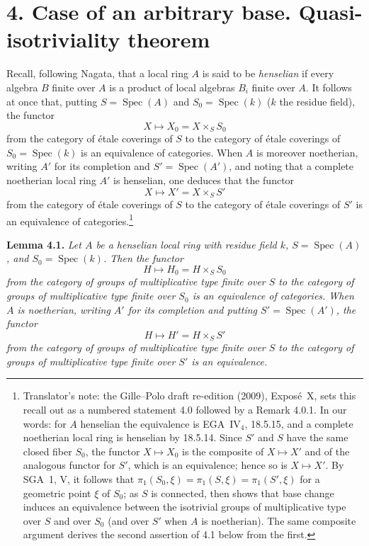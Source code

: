 \section*{4. Case of an arbitrary base. Quasi-isotriviality theorem}
{}

Recall, following Nagata, that a local ring \(A\) is said to be
\emph{henselian} if every algebra \(B\) finite over \(A\) is a product of local
algebras \(B_i\) finite over \(A\). It follows at once that, putting
\(S=\operatorname{Spec}(A)\) and \(S_0=\operatorname{Spec}(k)\) (\(k\) the
residue field), the functor
\[
  X\longmapsto X_0=X\times_S S_0
\]
from the category of étale coverings of \(S\) to the category of étale
coverings of \(S_0=\operatorname{Spec}(k)\) is an equivalence of categories.
When \(A\) is moreover noetherian, writing \(A'\) for its completion and
\(S'=\operatorname{Spec}(A')\), and noting that a complete noetherian local
ring \(A'\) is henselian, one deduces that the functor
\[
  X\longmapsto X'=X\times_S S'
\]
from the category of étale coverings of \(S\) to the category of étale
coverings of \(S'\) is an equivalence of categories.\footnote{Translator's
note: the Gille--Polo draft re-edition (2009), Expos\'e~X, sets this recall out
as a numbered statement 4.0 followed by a Remark 4.0.1. In our words: for
\(A\) henselian the equivalence is EGA~IV\(_4\), 18.5.15, and a complete
noetherian local ring is henselian by 18.5.14. Since \(S'\) and \(S\) have the
same closed fiber \(S_0\), the functor \(X\mapsto X_0\) is the composite of
\(X\mapsto X'\) and of the analogous functor for \(S'\), which is an
equivalence; hence so is \(X\mapsto X'\). By SGA~1, V, it follows that
\(\pi_1(S_0,\xi)=\pi_1(S,\xi)=\pi_1(S',\xi)\) for a geometric point \(\xi\) of
\(S_0\); as \(S\) is connected,  then shows that base change induces an
equivalence between the isotrivial groups of multiplicative type over \(S\)
and over \(S_0\) (and over \(S'\) when \(A\) is noetherian). The same composite
argument derives the second assertion of 4.1 below from the first.}

\par\medskip\noindent
\textbf{Lemma 4.1.}\enspace
\begingroup\itshape
Let \(A\) be a henselian local ring with residue field \(k\),
\(S=\operatorname{Spec}(A)\), and \(S_0=\operatorname{Spec}(k)\). Then the
functor
\[
  H\longmapsto H_0=H\times_S S_0
\]
from the category of groups of multiplicative type finite over \(S\) to the
category of groups of multiplicative type finite over \(S_0\) is an
equivalence of categories. When \(A\) is noetherian, writing \(A'\) for its
completion and putting \(S'=\operatorname{Spec}(A')\), the functor
\[
  H\longmapsto H'=H\times_S S'
\]
from the category of groups of multiplicative type finite over \(S\) to the
category of groups of multiplicative type finite over \(S'\) is an
equivalence.
\par\endgroup


